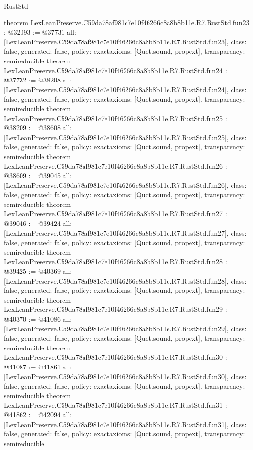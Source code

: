 \begin{lexlean}{RustStd}
\begin{coremodule}
{}
theorem LexLeanPreserve.C59da78af981c7e10f46266c8a8b8b11e.R7.RustStd.fun23 : @32093 := @37731 {
  all: [LexLeanPreserve.C59da78af981c7e10f46266c8a8b8b11e.R7.RustStd.fun23],
  class: false,
  generated: false,
  policy: exact{axioms: [Quot.sound, propext]},
  transparency: semireducible
}
theorem LexLeanPreserve.C59da78af981c7e10f46266c8a8b8b11e.R7.RustStd.fun24 : @37732 := @38208 {
  all: [LexLeanPreserve.C59da78af981c7e10f46266c8a8b8b11e.R7.RustStd.fun24],
  class: false,
  generated: false,
  policy: exact{axioms: [Quot.sound, propext]},
  transparency: semireducible
}
theorem LexLeanPreserve.C59da78af981c7e10f46266c8a8b8b11e.R7.RustStd.fun25 : @38209 := @38608 {
  all: [LexLeanPreserve.C59da78af981c7e10f46266c8a8b8b11e.R7.RustStd.fun25],
  class: false,
  generated: false,
  policy: exact{axioms: [Quot.sound, propext]},
  transparency: semireducible
}
theorem LexLeanPreserve.C59da78af981c7e10f46266c8a8b8b11e.R7.RustStd.fun26 : @38609 := @39045 {
  all: [LexLeanPreserve.C59da78af981c7e10f46266c8a8b8b11e.R7.RustStd.fun26],
  class: false,
  generated: false,
  policy: exact{axioms: [Quot.sound, propext]},
  transparency: semireducible
}
theorem LexLeanPreserve.C59da78af981c7e10f46266c8a8b8b11e.R7.RustStd.fun27 : @39046 := @39424 {
  all: [LexLeanPreserve.C59da78af981c7e10f46266c8a8b8b11e.R7.RustStd.fun27],
  class: false,
  generated: false,
  policy: exact{axioms: [Quot.sound, propext]},
  transparency: semireducible
}
theorem LexLeanPreserve.C59da78af981c7e10f46266c8a8b8b11e.R7.RustStd.fun28 : @39425 := @40369 {
  all: [LexLeanPreserve.C59da78af981c7e10f46266c8a8b8b11e.R7.RustStd.fun28],
  class: false,
  generated: false,
  policy: exact{axioms: [Quot.sound, propext]},
  transparency: semireducible
}
theorem LexLeanPreserve.C59da78af981c7e10f46266c8a8b8b11e.R7.RustStd.fun29 : @40370 := @41086 {
  all: [LexLeanPreserve.C59da78af981c7e10f46266c8a8b8b11e.R7.RustStd.fun29],
  class: false,
  generated: false,
  policy: exact{axioms: [Quot.sound, propext]},
  transparency: semireducible
}
theorem LexLeanPreserve.C59da78af981c7e10f46266c8a8b8b11e.R7.RustStd.fun30 : @41087 := @41861 {
  all: [LexLeanPreserve.C59da78af981c7e10f46266c8a8b8b11e.R7.RustStd.fun30],
  class: false,
  generated: false,
  policy: exact{axioms: [Quot.sound, propext]},
  transparency: semireducible
}
theorem LexLeanPreserve.C59da78af981c7e10f46266c8a8b8b11e.R7.RustStd.fun31 : @41862 := @42094 {
  all: [LexLeanPreserve.C59da78af981c7e10f46266c8a8b8b11e.R7.RustStd.fun31],
  class: false,
  generated: false,
  policy: exact{axioms: [Quot.sound, propext]},
  transparency: semireducible
}
\end{coremodule}
\end{lexlean}
